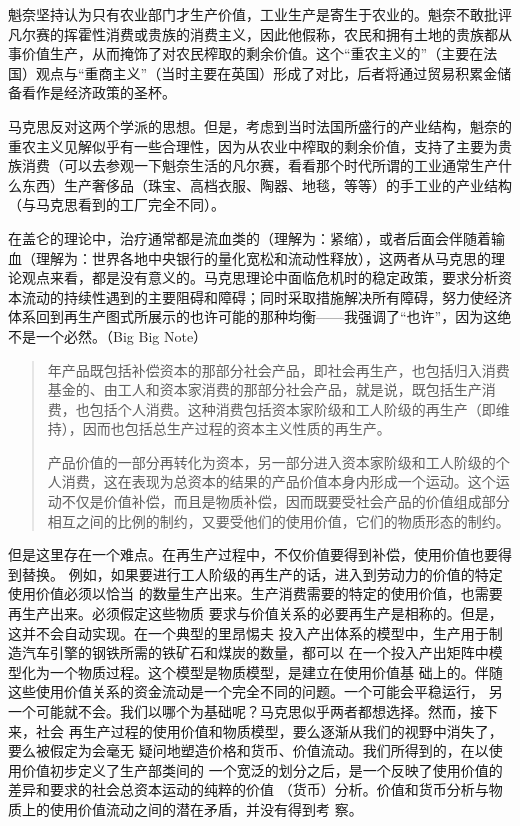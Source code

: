 魁奈坚持认为只有农业部门才生产价值，工业生产是寄生于农业的。魁奈不敢批评凡尔赛的挥霍性消费或贵族的消费主义，因此他假称，农民和拥有土地的贵族都从事价值生产，从而掩饰了对农民榨取的剩余价值。这个“重农主义的”（主要在法国）观点与“重商主义”（当时主要在英国）形成了对比，后者将通过贸易积累金储备看作是经济政策的圣杯。

马克思反对这两个学派的思想。但是，考虑到当时法国所盛行的产业结构，魁奈的重农主义见解似乎有一些合理性，因为从农业中榨取的剩余价值，支持了主要为贵族消费（可以去参观一下魁奈生活的凡尔赛，看看那个时代所谓的工业通常生产什么东西）生产奢侈品（珠宝、高档衣服、陶器、地毯，等等）的手工业的产业结构（与马克思看到的工厂完全不同）。

在盖仑的理论中，治疗通常都是流血类的（理解为：紧缩），或者后面会伴随着输血（理解为：世界各地中央银行的量化宽松和流动性释放），这两者从马克思的理论观点来看，都是没有意义的。马克思理论中面临危机时的稳定政策，要求分析资本流动的持续性遇到的主要阻碍和障碍；同时采取措施解决所有障碍，努力使经济体系回到再生产图式所展示的也许可能的那种均衡——我强调了“也许”，因为这绝不是一个必然。（Big Big Note）

\begin{quotation}
年产品既包括补偿资本的那部分社会产品，即社会再生产，也包括归入消费基金的、由工人和资本家消费的那部分社会产品，就是说，既包括生产消费，也包括个人消费。这种消费包括资本家阶级和工人阶级的再生产（即维持），因而也包括总生产过程的资本主义性质的再生产。 

产品价值的一部分再转化为资本，另一部分进入资本家阶级和工人阶级的个人消费，这在表现为总资本的结果的产品价值本身内形成一个运动。这个运动不仅是价值补偿，而且是物质补偿，因而既要受社会产品的价值组成部分相互之间的比例的制约，又要受他们的使用价值，它们的物质形态的制约。 

\end{quotation}

但是这里存在一个难点。在再生产过程中，不仅价值要得到补偿，使用价值也要得到替换。
例如，如果要进行工人阶级的再生产的话，进入到劳动力的价值的特定使用价值必须以恰当
的数量生产出来。生产消费需要的特定的使用价值，也需要再生产出来。必须假定这些物质
要求与价值关系的必要再生产是相称的。但是，这并不会自动实现。在一个典型的里昂惕夫
投入产出体系的模型中，生产用于制造汽车引擎的钢铁所需的铁矿石和煤炭的数量，都可以
在一个投入产出矩阵中模型化为一个物质过程。这个模型是物质模型，是建立在使用价值基
础上的。伴随这些使用价值关系的资金流动是一个完全不同的问题。一个可能会平稳运行，
另一个可能就不会。我们以哪个为基础呢？马克思似乎两者都想选择。然而，接下来，社会
再生产过程的使用价值和物质模型，要么逐渐从我们的视野中消失了，要么被假定为会毫无
疑问地塑造价格和货币、价值流动。我们所得到的，在以使用价值初步定义了生产部类间的
一个宽泛的划分之后，是一个反映了使用价值的差异和要求的社会总资本运动的纯粹的价值
（货币）分析。价值和货币分析与物质上的使用价值流动之间的潜在矛盾，并没有得到考
察。

